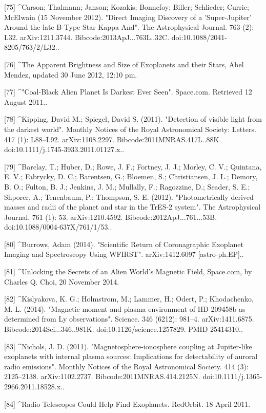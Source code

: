 [75]
^Carson; Thalmann; Janson; Kozakis; Bonnefoy; Biller; Schlieder; Currie; McElwain (15 November 2012). "Direct Imaging Discovery of a 'Super-Jupiter' Around the late B-Type Star Kappa And". The Astrophysical Journal. 763 (2): L32. arXiv:1211.3744. Bibcode:2013ApJ...763L..32C. doi:10.1088/2041-8205/763/2/L32..

[76]
^The Apparent Brightness and Size of Exoplanets and their Stars, Abel Mendez, updated 30 June 2012, 12:10 pm.

[77]
^"Coal-Black Alien Planet Is Darkest Ever Seen". Space.com. Retrieved 12 August 2011..

[78]
^Kipping, David M.; Spiegel, David S. (2011). "Detection of visible light from the darkest world". Monthly Notices of the Royal Astronomical Society: Letters. 417 (1): L88–L92. arXiv:1108.2297. Bibcode:2011MNRAS.417L..88K. doi:10.1111/j.1745-3933.2011.01127.x..

[79]
^Barclay, T.; Huber, D.; Rowe, J. F.; Fortney, J. J.; Morley, C. V.; Quintana, E. V.; Fabrycky, D. C.; Barentsen, G.; Bloemen, S.; Christiansen, J. L.; Demory, B. O.; Fulton, B. J.; Jenkins, J. M.; Mullally, F.; Ragozzine, D.; Seader, S. E.; Shporer, A.; Tenenbaum, P.; Thompson, S. E. (2012). "Photometrically derived masses and radii of the planet and star in the TrES-2 system". The Astrophysical Journal. 761 (1): 53. arXiv:1210.4592. Bibcode:2012ApJ...761...53B. doi:10.1088/0004-637X/761/1/53..

[80]
^Burrows, Adam (2014). "Scientific Return of Coronagraphic Exoplanet Imaging and Spectroscopy Using WFIRST". arXiv:1412.6097 [astro-ph.EP]..

[81]
^Unlocking the Secrets of an Alien World's Magnetic Field, Space.com, by Charles Q. Choi, 20 November 2014.

[82]
^Kislyakova, K. G.; Holmstrom, M.; Lammer, H.; Odert, P.; Khodachenko, M. L. (2014). "Magnetic moment and plasma environment of HD 209458b as determined from Ly observations". Science. 346 (6212): 981–4. arXiv:1411.6875. Bibcode:2014Sci...346..981K. doi:10.1126/science.1257829. PMID 25414310..

[83]
^Nichols, J. D. (2011). "Magnetosphere-ionosphere coupling at Jupiter-like exoplanets with internal plasma sources: Implications for detectability of auroral radio emissions". Monthly Notices of the Royal Astronomical Society. 414 (3): 2125–2138. arXiv:1102.2737. Bibcode:2011MNRAS.414.2125N. doi:10.1111/j.1365-2966.2011.18528.x..

[84]
^Radio Telescopes Could Help Find Exoplanets. RedOrbit. 18 April 2011.

